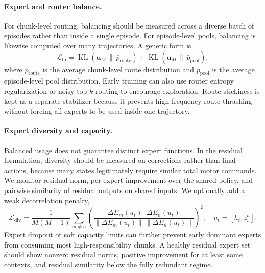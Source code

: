 \documentclass[10pt]{article}
\newcommand{\KL}{\operatorname{KL}}
\begin{document}
\paragraph{Expert and router balance.}
For chunk-level routing, balancing should be measured across a diverse batch of episodes rather than inside a single episode. For episode-level pools, balancing is likewise computed over many trajectories. A generic form is
\begin{equation}
\mathcal{L}_{\mathrm{lb}}
=\KL(\mathbf{u}_M\,\|\,\bar{p}_{\mathrm{route}})
+\KL(\mathbf{u}_M\,\|\,\bar{p}_{\mathrm{pool}}),
\end{equation}
where $\bar{p}_{\mathrm{route}}$ is the average chunk-level route distribution and $\bar{p}_{\mathrm{pool}}$ is the average episode-level pool distribution. Early training can also use router entropy regularization or noisy top-$k$ routing to encourage exploration. Route stickiness is kept as a separate stabilizer because it prevents high-frequency route thrashing without forcing all experts to be used inside one trajectory.

\paragraph{Expert diversity and capacity.}
Balanced usage does not guarantee distinct expert functions. In the residual formulation, diversity should be measured on corrections rather than final actions, because many states legitimately require similar total motor commands. We monitor residual norm, per-expert improvement over the shared policy, and pairwise similarity of residual outputs on shared inputs. We optionally add a weak decorrelation penalty,
\begin{equation}
\mathcal{L}_{\mathrm{div}}
=\frac{1}{M(M-1)}\sum_{m\ne n}
\left(\frac{\Delta E_m(u_t)^\top \Delta E_n(u_t)}
{\|\Delta E_m(u_t)\|\,\|\Delta E_n(u_t)\|}\right)^2,
\quad u_t=[h_t,z_t^a].
\end{equation}
Expert dropout or soft capacity limits can further prevent early dominant experts from consuming most high-responsibility chunks. A healthy residual expert set should show nonzero residual norms, positive improvement for at least some contexts, and residual similarity below the fully redundant regime.
\end{document}
